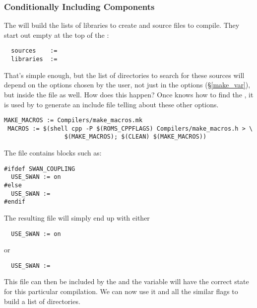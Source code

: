 \subsubsection{Conditionally Including Components}

The  will build the lists of libraries to create and source
files to compile. They start out empty at the top of the
:
\begin{verbatim}
  sources    := 
  libraries  :=
\end{verbatim}
That's simple enough, but the list of directories to search for
these sources will depend on the options chosen by the user, not
just in the  options (\S\ref{make_var}), but inside the
 file as well. How does this happen? Once 
knows how to find the , it is used by 
to generate an include file telling  about these other options.
\begin{verbatim}
MAKE_MACROS := Compilers/make_macros.mk
 MACROS := $(shell cpp -P $(ROMS_CPPFLAGS) Compilers/make_macros.h > \
                 $(MAKE_MACROS); $(CLEAN) $(MAKE_MACROS))
\end{verbatim}
The  file contains blocks such as:
\begin{verbatim}
#ifdef SWAN_COUPLING
  USE_SWAN := on
#else
  USE_SWAN :=
#endif
\end{verbatim}
The resulting  file will simply end up with
either 
\begin{verbatim}
  USE_SWAN := on
\end{verbatim}
or
\begin{verbatim}
  USE_SWAN :=
\end{verbatim}
This file can then be included by the  and the
variable  will have the correct state for this
particular compilation. We can now use it and all the similar flags
to build a list of directories.

